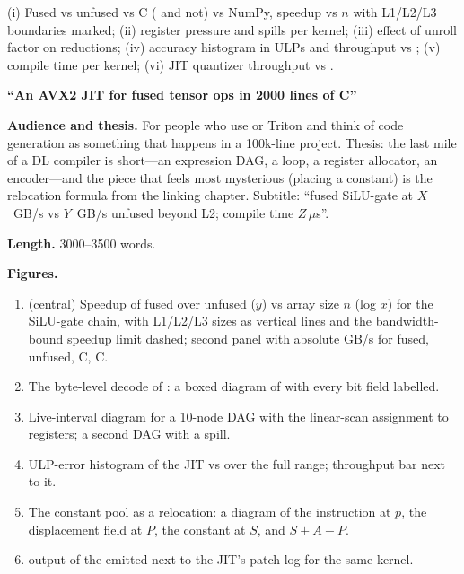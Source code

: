 (i) Fused vs unfused vs  C ( and not) vs NumPy, speedup vs $n$ with L1/L2/L3 boundaries marked; (ii) register pressure and spills per kernel; (iii) effect of unroll factor on reductions; (iv)  accuracy histogram in ULPs and throughput vs ; (v) compile time per kernel; (vi) JIT quantizer throughput vs .

\begin{blogbox}
 \textbf{``An AVX2 JIT for fused tensor ops in 2000 lines of C''}

\textbf{Audience and thesis.} For people who use  or Triton and think of code generation as something that happens in a 100k-line project. Thesis: the last mile of a DL compiler is short---an expression DAG, a loop, a register allocator, an encoder---and the piece that feels most mysterious (placing a constant) is the relocation formula from the linking chapter. Subtitle: ``fused SiLU-gate at $X$~GB/s vs $Y$~GB/s unfused beyond L2; compile time $Z\,\mu$s''.

\textbf{Length.} 3000--3500 words.

\textbf{Figures.}
\begin{enumerate}
  \item {} (central) Speedup of fused over unfused ($y$) vs array size $n$ (log $x$) for the SiLU-gate chain, with L1/L2/L3 sizes as vertical lines and the bandwidth-bound speedup limit dashed; second panel with absolute GB/s for fused, unfused,  C,  C.
  \item {} The byte-level decode of : a boxed diagram of  with every bit field labelled.
  \item {} Live-interval diagram for a 10-node DAG with the linear-scan assignment to  registers; a second DAG with a spill.
  \item {} ULP-error histogram of the JIT  vs  over the full range; throughput bar next to it.
  \item {} The constant pool as a relocation: a diagram of the instruction at $p$, the displacement field at $P$, the constant at $S$, and $S + A - P$.
  \item {}  output of the emitted  next to the JIT's patch log for the same kernel.
\end{enumerate}


\end{blogbox}
